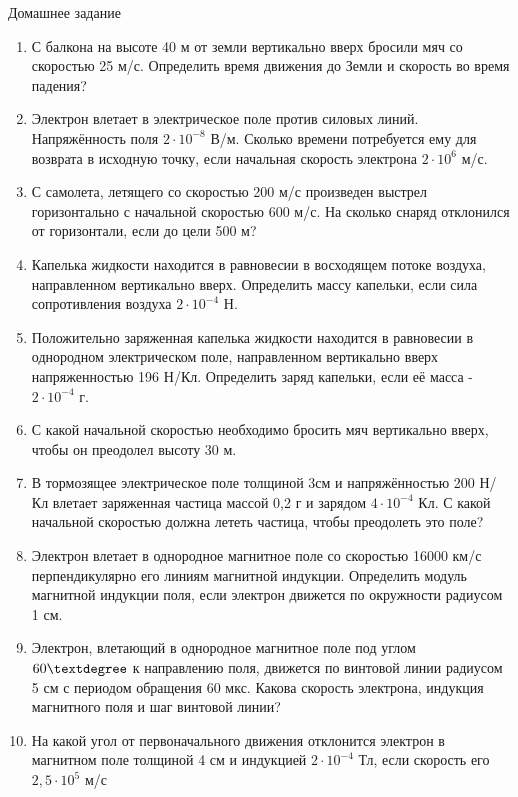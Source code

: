 \documentclass[a5paper, 10pt]{diss_4}
\renewcommand{\'}{\,'}
\begin{document}
\begin{center}
   Домашнее задание
\end{center}
\begin{enumerate}

\item С балкона на высоте 40 м от земли вертикально вверх бросили мяч со скоростью 25 м/с. Определить время движения до Земли и скорость во время падения?

\item Электрон влетает в электрическое поле против силовых линий. Напряжённость поля $2\cdot10^{-8}$ В/м. Сколько времени потребуется ему для возврата в исходную точку, если начальная скорость электрона $2\cdot10^6$ м/с.

\item С самолета, летящего со скоростью 200 м/с произведен выстрел горизонтально с начальной скоростью 600 м/с. На сколько снаряд отклонился от горизонтали, если до цели  500 м?

\item Капелька жидкости находится в равновесии в восходящем потоке воздуха, направленном  вертикально вверх. Определить массу капельки, если сила сопротивления воздуха $2\cdot10^{-4}$ Н.

\item Положительно заряженная капелька жидкости находится в равновесии в однородном электрическом поле, направленном  вертикально вверх напряженностью  196 Н/Кл. Определить заряд капельки, если её масса  - $2\cdot10^{-4}$ г.

\item С какой начальной скоростью необходимо бросить мяч вертикально вверх, чтобы он преодолел высоту 30 м.

\item В тормозящее электрическое поле толщиной 3см и напряжённостью 200 Н/Кл влетает заряженная частица массой 0,2 г и зарядом
$4\cdot10^{-4}$ Кл. С какой начальной скоростью должна лететь частица, чтобы преодолеть это поле?

\item Электрон влетает в однородное магнитное поле со скоростью 16000 км/с перпендикулярно его линиям магнитной индукции. Определить модуль магнитной индукции поля, если электрон движется по окружности радиусом 1 см.

\item Электрон, влетающий в однородное магнитное поле под углом $60\textdegree$ к направлению поля, движется по винтовой линии радиусом 5 см с периодом обращения 60 мкс. Какова скорость электрона, индукция магнитного поля и шаг винтовой линии?

\item На какой угол от первоначального движения отклонится электрон в магнитном поле толщиной 4 см и индукцией $2\cdot10^{-4}$ Тл, если скорость его $2,5\cdot10^5$ м/с

\end{enumerate}
\end{document}
